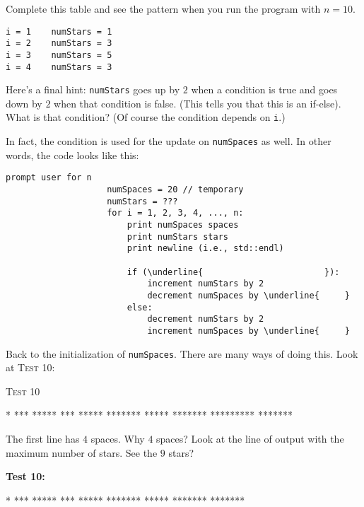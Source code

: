 Complete this table and see the pattern when you run the program with $n = 10$.

\begin{verbatim}
i = 1    numStars = 1
i = 2    numStars = 3
i = 3    numStars = 5
i = 4    numStars = 3
\end{verbatim}

Here's a final hint: \verb!numStars! goes up by $2$ when a condition is true
and goes down by $2$ when that condition is false. (This tells you that this
is an if-else). What is that condition? (Of course the condition depends on
\verb!i!.)

In fact, the condition is used for the update on \verb!numSpaces! as well. In
other words, the code looks like this:

\begin{Verbatim}[commandchars=\\\{\}]
                    prompt user for n
                    numSpaces = 20 // temporary
                    numStars = ???
                    for i = 1, 2, 3, 4, ..., n:
                        print numSpaces spaces
                        print numStars stars
                        print newline (i.e., std::endl)

                        if (\underline{                        }):
                            increment numStars by 2
                            decrement numSpaces by \underline{     }
                        else:
                            decrement numStars by 2
                            increment numSpaces by \underline{     }
\end{Verbatim}

Back to the initialization of \verb!numSpaces!. There are many ways of doing
this. Look at \textsc{Test 10}:

\textsc{Test 10}
\begin{console}[commandchars=\\\{\}]
    *
   ***
  *****
   ***
  *****
 *******
  *****
 *******
*********
 *******
\end{console}

The first line has $4$ spaces. Why $4$ spaces? Look at the line of output with
the maximum number of stars. See the $9$ stars?

\textbf{Test 10:}
\begin{console}[commandchars=\\\{\}]
*
   ***
  *****
   ***
  *****
 *******
  *****
 *******
\userinput{*********}
 *******
\end{console}

